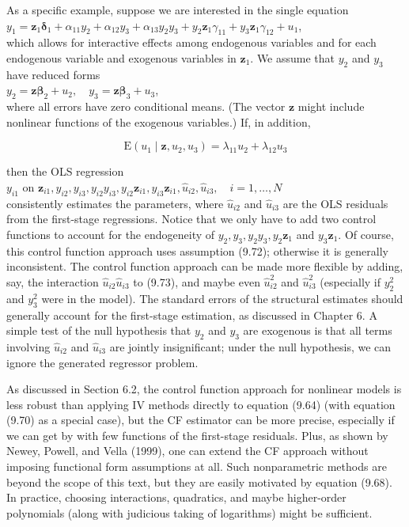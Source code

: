 \documentclass[10pt]{article}
\begin{document}
As a specific example, suppose we are interested in the single equation\\
$y_{1}=\mathbf{z}_{1} \boldsymbol{\delta}_{1}+\alpha_{11} y_{2}+\alpha_{12} y_{3}+\alpha_{13} y_{2} y_{3}+y_{2} \mathbf{z}_{1} \gamma_{11}+y_{3} \mathbf{z}_{1} \gamma_{12}+u_{1}$,\\
which allows for interactive effects among endogenous variables and for each endogenous variable and exogenous variables in $\mathbf{z}_{1}$. We assume that $y_{2}$ and $y_{3}$ have reduced forms\\
$y_{2}=\mathbf{z} \boldsymbol{\beta}_{2}+u_{2}, \quad y_{3}=\mathbf{z} \boldsymbol{\beta}_{3}+u_{3}$,\\
where all errors have zero conditional means. (The vector $\mathbf{z}$ might include nonlinear functions of the exogenous variables.) If, in addition,


\begin{equation*}
\mathrm{E}\left(u_{1} \mid \mathbf{z}, u_{2}, u_{3}\right)=\lambda_{11} u_{2}+\lambda_{12} u_{3} \tag{9.72}
\end{equation*}


then the OLS regression\\
$y_{i 1}$ on $\mathbf{z}_{i 1}, y_{i 2}, y_{i 3}, y_{i 2} y_{i 3}, y_{i 2} \mathbf{z}_{i 1}, y_{i 3} \mathbf{z}_{i 1}, \hat{u}_{i 2}, \hat{u}_{i 3}, \quad i=1, \ldots, N$\\
consistently estimates the parameters, where $\hat{u}_{i 2}$ and $\hat{u}_{i 3}$ are the OLS residuals from the first-stage regressions. Notice that we only have to add two control functions to account for the endogeneity of $y_{2}, y_{3}, y_{2} y_{3}, y_{2} \mathbf{z}_{1}$ and $y_{3} \mathbf{z}_{1}$. Of course, this control function approach uses assumption (9.72); otherwise it is generally inconsistent. The control function approach can be made more flexible by adding, say, the interaction $\hat{u}_{i 2} \hat{u}_{i 3}$ to (9.73), and maybe even $\hat{u}_{i 2}^{2}$ and $\hat{u}_{i 3}^{2}$ (especially if $y_{2}^{2}$ and $y_{3}^{2}$ were in the model). The standard errors of the structural estimates should generally account for the first-stage estimation, as discussed in Chapter 6. A simple test of the null hypothesis that $y_{2}$ and $y_{3}$ are exogenous is that all terms involving $\hat{u}_{i 2}$ and $\hat{u}_{i 3}$ are jointly insignificant; under the null hypothesis, we can ignore the generated regressor problem.

As discussed in Section 6.2, the control function approach for nonlinear models is less robust than applying IV methods directly to equation (9.64) (with equation (9.70) as a special case), but the CF estimator can be more precise, especially if we can get by with few functions of the first-stage residuals. Plus, as shown by Newey, Powell, and Vella (1999), one can extend the CF approach without imposing functional form assumptions at all. Such nonparametric methods are beyond the scope of this text, but they are easily motivated by equation (9.68). In practice, choosing interactions, quadratics, and maybe higher-order polynomials (along with judicious taking of logarithms) might be sufficient.
\end{document}
